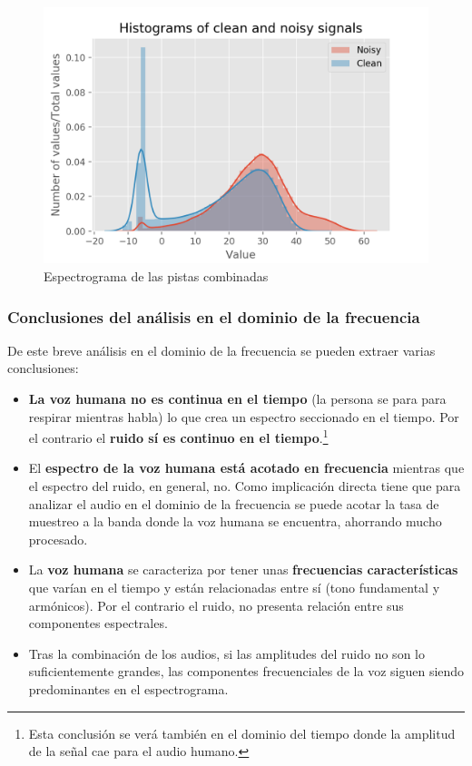 \begin{figure}[h!]
	\centering
	\includegraphics[width=0.6\columnwidth]{figures/band0_clean_noisy_hist.png}
	\caption{Espectrograma de las pistas combinadas}
	\label{fig: band0_clean_noisy_hist}
\end{figure}

\subsubsection{Conclusiones del análisis en el dominio de la frecuencia}
De este breve análisis en el dominio de la frecuencia se pueden extraer varias conclusiones:
\begin{itemize}
	\item \textbf{La voz humana no es continua en el tiempo} (la persona se para para respirar mientras habla) lo que crea un espectro seccionado en el tiempo. Por el contrario el \textbf{ruido sí es continuo en el tiempo}.\footnote{Esta conclusión se verá también en el dominio del tiempo donde la amplitud de la señal cae para el audio humano.}
	\item El \textbf{espectro de la voz humana está acotado en frecuencia} mientras que el espectro del ruido, en general, no. Como implicación directa tiene que para analizar el audio en el dominio de la frecuencia se puede acotar la tasa de muestreo a la banda donde la voz humana se encuentra, ahorrando mucho procesado.
	\item La \textbf{voz humana} se caracteriza por tener unas \textbf{frecuencias características} que varían en el tiempo y están relacionadas entre sí (tono fundamental y armónicos). Por el contrario el ruido, no presenta relación entre sus componentes espectrales.
	\item Tras la combinación de los audios, si las amplitudes del ruido no son lo suficientemente grandes, las componentes frecuenciales de la voz siguen siendo predominantes en el espectrograma.
\end{itemize}

